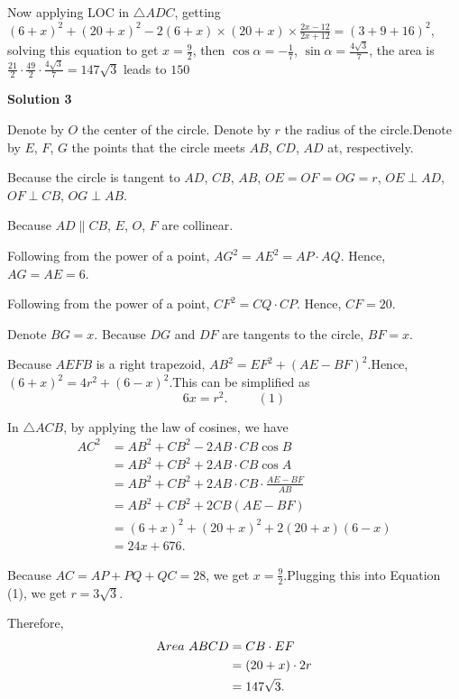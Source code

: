\begin{enumerate}
 Now applying LOC in $\triangle{ADC}$, getting $(6+x)^2+(20+x)^2-2(6+x)\times(20+x)\times\frac{2x-12}{2x+12}=(3+9+16)^2$, solving this equation to get $x=\frac{9}{2}$, then $\cos\alpha=-\frac{1}{7}$, $\sin\alpha=\frac{4\sqrt{3}}{7}$, the area is $\frac{21}{2}\cdot\frac{49}{2}\cdot\frac{4\sqrt{3}}{7}=147\sqrt{3}$ leads to $\boxed{150}$




\textbf{Solution 3}

Denote by $O$ the center of the circle. Denote by $r$ the radius of the circle.Denote by $E$, $F$, $G$ the points that the circle meets $AB$, $CD$, $AD$ at, respectively.

 Because the circle is tangent to $AD$, $CB$, $AB$, $OE = OF = OG = r$, $OE \perp AD$, $OF \perp CB$, $OG \perp AB$.

 Because $AD \parallel CB$, $E$, $O$, $F$ are collinear. 

 Following from the power of a point, $AG^2 = AE^2 = AP \cdot AQ$. Hence, $AG = AE = 6$.

 Following from the power of a point, $CF^2 = CQ \cdot CP$. Hence, $CF = 20$.

 Denote $BG = x$. Because $DG$ and $DF$ are tangents to the circle, $BF = x$.

 Because $AEFB$ is a right trapezoid, $AB^2 = EF^2 + \left( AE - BF \right)^2$.Hence, $\left( 6 + x \right)^2 = 4 r^2 + \left( 6 - x \right)^2$.This can be simplified as 
 \[ 6 x = r^2 . \hspace{1cm} (1) \]

 In $\triangle ACB$, by applying the law of cosines, we have
 \begin{align*} AC^2 & = AB^2 + CB^2 - 2 AB \cdot CB \cos B \\ & = AB^2 + CB^2 + 2 AB \cdot CB \cos A \\ & = AB^2 + CB^2 + 2 AB \cdot CB \cdot \frac{AE - BF}{AB} \\ & = AB^2 + CB^2 + 2 CB \left( AE - BF \right) \\ & = \left( 6 + x \right)^2 + \left( 20 + x \right)^2 + 2 \left( 20 + x \right) \left( 6 - x \right) \\ & = 24 x + 676 . \end{align*}


 Because $AC = AP + PQ + QC = 28$, we get $x = \frac{9}{2}$.Plugging this into Equation (1), we get $r = 3 \sqrt{3}$.

 Therefore,
 \begin{align*} {\textrm Area} \ ABCD & = CB \cdot EF \\ & = \left( 20 + x \right) \cdot 2r \\ & = 147 \sqrt{3} . \end{align*}



\end{enumerate}
